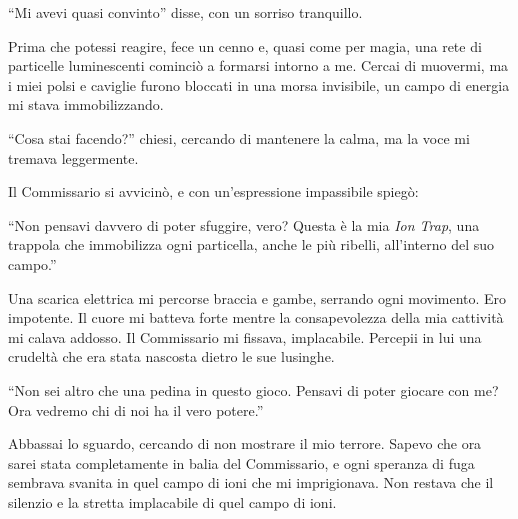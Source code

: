 \begin{dialogue}
 \enquote{Mi avevi quasi convinto} disse, con un sorriso tranquillo.
\end{dialogue}

Prima che potessi reagire, fece un cenno e, quasi come per magia, una rete di particelle luminescenti cominciò a formarsi intorno a me. Cercai di muovermi, ma i miei polsi e caviglie furono bloccati in una morsa invisibile, un campo di energia mi stava immobilizzando.

\begin{dialogue}
 \enquote{Cosa stai facendo?} chiesi, cercando di mantenere la calma, ma la voce mi tremava leggermente.
\end{dialogue}

Il Commissario si avvicinò, e con un'espressione impassibile spiegò:

\begin{dialogue}
 \enquote{Non pensavi davvero di poter sfuggire, vero? Questa è la mia \textit{Ion Trap}, una trappola  che immobilizza ogni particella, anche le più ribelli,  all'interno del suo campo.}
\end{dialogue}

Una scarica elettrica mi percorse braccia e gambe, serrando ogni movimento. Ero impotente. Il cuore mi batteva forte mentre la consapevolezza della mia cattività mi calava addosso. Il Commissario mi fissava, implacabile. Percepii in lui una crudeltà che era stata nascosta dietro le sue lusinghe.

\begin{dialogue}
 \enquote{Non sei altro che una pedina in questo gioco. Pensavi di poter giocare con me?  Ora vedremo chi di noi ha il vero potere.}
\end{dialogue}

Abbassai lo sguardo, cercando di non mostrare il mio terrore. Sapevo che ora sarei stata completamente in balia del Commissario, e ogni speranza di fuga sembrava svanita in quel campo di ioni che mi imprigionava. Non restava che il silenzio e la stretta implacabile di quel campo di ioni.

